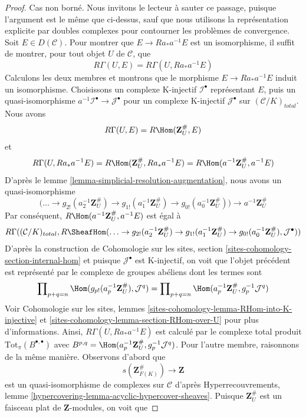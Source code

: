 \begin{proof}
\medskip\noindent
Cas non borné. Nous invitons le lecteur à sauter ce passage, puisque l'argument
est le même que ci-dessus, sauf que nous utilisons la représentation explicite
par doubles complexes pour contourner les problèmes de convergence.
Soit $E \in D(\mathcal{C})$.
Pour montrer que $E \to Ra_*a^{-1}E$ est un isomorphisme,
il suffit de montrer, pour tout objet $U$ de $\mathcal{C}$, que
$$
R\Gamma(U, E) = R\Gamma(U, Ra_*a^{-1}E)
$$
Calculons les deux membres et montrons que le morphisme $E \to Ra_*a^{-1}E$
induit un isomorphisme. Choisissons un complexe K-injectif
$\mathcal{I}^\bullet$ représentant $E$, puis un quasi-isomorphisme
$a^{-1}\mathcal{I}^\bullet \to \mathcal{J}^\bullet$
pour un complexe K-injectif $\mathcal{J}^\bullet$ sur
$(\mathcal{C}/K)_{total}$. Nous avons
$$
R\Gamma(U, E) = R\Hom(\mathbf{Z}_U^\#, E)
$$
et
$$
R\Gamma(U, Ra_*a^{-1}E) = R\Hom(\mathbf{Z}_U^\#, Ra_*a^{-1}E) =
R\Hom(a^{-1}\mathbf{Z}_U^\#, a^{-1}E)
$$
D'après le lemme \ref{lemma-simplicial-resolution-augmentation},
nous avons un quasi-isomorphisme
$$
\Big(\ldots \to
g_{2!}(a_2^{-1}\mathbf{Z}_U^\#) \to
g_{1!}(a_1^{-1}\mathbf{Z}_U^\#) \to
g_{0!}(a_0^{-1}\mathbf{Z}_U^\#)\Big)
\longrightarrow
a^{-1}\mathbf{Z}_U^\#
$$
Par conséquent, $R\Hom(a^{-1}\mathbf{Z}_U^\#, a^{-1}E)$ est égal à
$$
R\Gamma((\mathcal{C}/K)_{total},
R\SheafHom(
\ldots \to
g_{2!}(a_2^{-1}\mathbf{Z}_U^\#) \to
g_{1!}(a_1^{-1}\mathbf{Z}_U^\#) \to
g_{0!}(a_0^{-1}\mathbf{Z}_U^\#),
\mathcal{J}^\bullet))
$$
D'après la construction de Cohomologie sur les sites, section
\ref{sites-cohomology-section-internal-hom}
et puisque $\mathcal{J}^\bullet$ est K-injectif, on voit que
l'objet précédent est représenté par le complexe de groupes abéliens dont les termes sont
$$
\prod\nolimits_{p + q = n}
\Hom(g_{p!}(a_p^{-1}\mathbf{Z}_U^\#), \mathcal{J}^q) =
\prod\nolimits_{p + q = n}
\Hom(a_p^{-1}\mathbf{Z}_U^\#, g_p^{-1}\mathcal{J}^q)
$$
Voir Cohomologie sur les sites, lemmes
\ref{sites-cohomology-lemma-RHom-into-K-injective} et
\ref{sites-cohomology-lemma-section-RHom-over-U} pour plus d’informations.
Ainsi, $R\Gamma(U, Ra_*a^{-1}E)$ est calculé par
le complexe total produit $\text{Tot}_\pi(B^{\bullet, \bullet})$
avec $B^{p, q} = \Hom(a_p^{-1}\mathbf{Z}_U^\#, g_p^{-1}\mathcal{J}^q)$.
Pour l'autre membre, raisonnons de la même manière. Observons d'abord que
$$
s(\mathbf{Z}_{F(K)}^\#) \longrightarrow \mathbf{Z}
$$
est un quasi-isomorphisme de complexes sur $\mathcal{C}$
d'après Hyperrecouvrements, lemme \ref{hypercovering-lemma-acyclic-hypercover-sheaves}.
Puisque $\mathbf{Z}_U^\#$ est un faisceau plat de $\mathbf{Z}$-modules,
on voit que

\end{proof}
